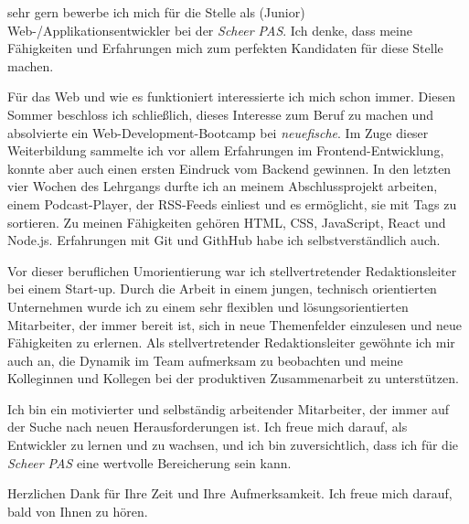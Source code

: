 \documentclass[11pt, a4paper]{awesome-cv}
\begin{document}
\makecvheader[R]


\makelettertitle

\begin{cvletter}

sehr gern bewerbe ich mich für die Stelle als (Junior) Web-/Applikationsentwickler bei der \emph{Scheer PAS}. Ich denke, dass meine Fähigkeiten und Erfahrungen mich zum perfekten Kandidaten für diese Stelle machen.

Für das Web und wie es funktioniert interessierte ich mich schon immer. Diesen Sommer beschloss ich schließlich, dieses Interesse zum Beruf zu machen und absolvierte ein Web-Development-Bootcamp bei \emph{neuefische}. Im Zuge dieser Weiterbildung sammelte ich vor allem Erfahrungen im Frontend-Entwicklung, konnte aber auch einen ersten Eindruck vom Backend gewinnen. In den letzten vier Wochen des Lehrgangs durfte ich an meinem Abschlussprojekt arbeiten, einem Podcast-Player, der RSS-Feeds einliest und es ermöglicht, sie mit Tags zu sortieren. Zu meinen Fähigkeiten gehören HTML, CSS, JavaScript, React und Node.js. Erfahrungen mit Git und GithHub habe ich selbstverständlich auch.

Vor dieser beruflichen Umorientierung war ich stellvertretender Redaktionsleiter bei einem Start-up. Durch die Arbeit in einem jungen, technisch orientierten Unternehmen wurde ich zu einem sehr flexiblen und lösungsorientierten Mitarbeiter, der immer bereit ist, sich in neue Themenfelder einzulesen und neue Fähigkeiten zu erlernen. Als stellvertretender Redaktionsleiter gewöhnte ich mir auch an, die Dynamik im Team aufmerksam zu beobachten und meine Kolleginnen und Kollegen bei der produktiven Zusammenarbeit zu unterstützen.
  
Ich bin ein motivierter und selbständig arbeitender Mitarbeiter, der immer auf der Suche nach neuen Herausforderungen ist. Ich freue mich darauf, als Entwickler zu lernen und zu wachsen, und ich bin zuversichtlich, dass ich für die \emph{Scheer PAS} eine wertvolle Bereicherung sein kann.
  
Herzlichen Dank für Ihre Zeit und Ihre Aufmerksamkeit. Ich freue mich darauf, bald von Ihnen zu hören.


\end{cvletter}


\makeletterclosing
\end{document}
